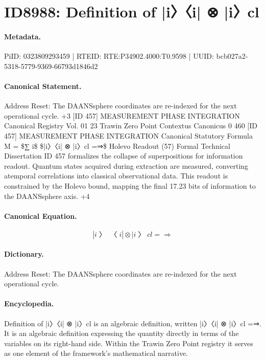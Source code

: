 \section*{ID8988: Definition of |i〉〈i| ⊗ |i〉cl}
\paragraph{Metadata.}
PiID: 0323809293459 | RTEID: RTE:P34902.4000:T0.9598 | UUID: bcb027a2-5318-5779-9369-66793d1846d2

\paragraph{Canonical Statement.}
Address Reset: The DAANSsphere coordinates are re-indexed for the next operational cycle. +3 [ID 457] MEASUREMENT PHASE INTEGRATION Canonical Registry Vol. 01 23 Trawin Zero Point Contextus Canonicus 0 460 [ID 457] MEASUREMENT PHASE INTEGRATION Canonical Statutory Formula M = \$∑ i\$ \$|i〉〈i| ⊗ |i〉cl =⇒\$ Holevo Readout (57) Formal Technical Dissertation ID 457 formalizes the collapse of superpositions for information readout. Quantum states acquired during extraction are measured, converting atemporal correlations into classical observational data. This readout is constrained by the Holevo bound, mapping the final 17.23 bits of information to the DAANSsphere axis. +4

\paragraph{Canonical Equation.}
\[
|i〉〈i| ⊗ |i〉cl =⇒
\]

\paragraph{Dictionary.}
Address Reset: The DAANSsphere coordinates are re-indexed for the next operational cycle.

\paragraph{Encyclopedia.}
Definition of |i〉〈i| ⊗ |i〉cl is an algebraic definition, written |i〉〈i| ⊗ |i〉cl =⇒. It is an algebraic definition expressing the quantity directly in terms of the variables on its right-hand side. Within the Trawin Zero Point registry it serves as one element of the framework's mathematical narrative.
